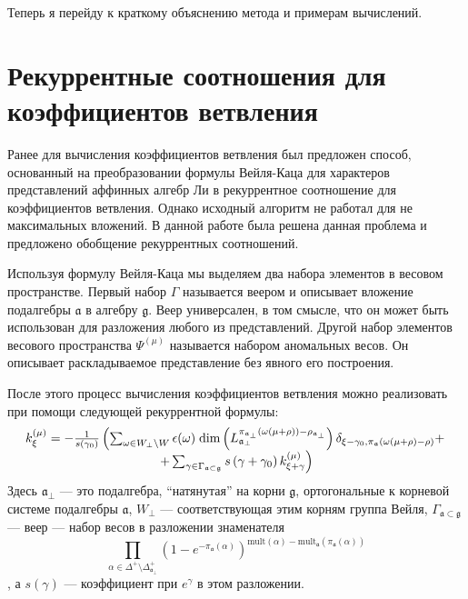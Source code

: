 \documentclass[a4paper,12pt]{article}
\theoremstyle{definition} \newtheorem{Def}{Definition}
\begin{document}
Теперь я перейду к краткому объяснению метода и примерам вычислений.

\section{Рекуррентные соотношения для коэффициентов ветвления}
\label{sec:branching}

Ранее для вычисления коэффициентов ветвления был предложен способ, основанный на преобразовании
формулы Вейля-Каца для характеров представлений аффинных алгебр Ли в рекуррентное соотношение для
коэффициентов ветвления. Однако исходный алгоритм не работал для не максимальных вложений. В данной
работе была решена данная проблема и предложено обобщение рекуррентных соотношений. 

Используя формулу Вейля-Каца мы выделяем два набора элементов в весовом пространстве. Первый набор $\Gamma$
называется веером и описывает вложение подалгебры $\mathfrak{a}$ в алгебру $\mathfrak{g}$. Веер
универсален, в том смысле, что он может быть использован для разложения любого из представлений.
Другой набор элементов весового пространства $\Psi ^{\left( \mu \right) }$ называется набором
аномальных весов. Он описывает раскладываемое представление без явного его построения. 

После этого процесс вычисления коэффициентов ветвления можно реализовать при помощи следующей
рекуррентной формулы:
\begin{equation}
  \label{eq:1}
  \begin{array}{c}
      k_{\xi }^{\left( \mu \right) }=-\frac{1}{s\left( \gamma _{0}\right) }\left(
  \sum_{\omega\in W_{\bot}\backslash W} \epsilon(\omega)\; {\rm dim}\left(L^{\pi_{\mathfrak{a}_{\bot}}(\omega(\mu+\rho))-\rho_{\mathfrak{a}_{\bot}}}_{\mathfrak{a}_{\bot}}\right) \delta_{\xi-\gamma_0,\pi_{\mathfrak{a}}(\omega(\mu+\rho)-\rho)}+ \right.\\
\left.
+\sum_{\gamma \in
\Gamma _{\frak{a}\subset \frak{g}}}s\left( \gamma +\gamma _{0}\right) k_{\xi
+\gamma }^{\left( \mu \right) }\right)

  \end{array}
\end{equation}
Здесь $\mathfrak{a}_{\bot}$ --- это подалгебра, ``натянутая'' на корни $\mathfrak{g}$, ортогональные
к корневой системе подалгебры  $\mathfrak{a}$, $W_{\bot}$ --- соответствующая этим корням группа Вейля,
$\Gamma_{\mathfrak{a}\subset \mathfrak{g}}$ --- веер --- набор весов в разложении знаменателя $$\prod_{\alpha\in \Delta^{+}\setminus \Delta^{+}_{\mathfrak{a}_{\bot}}}
(1-e^{-\pi_{\mathfrak{a}}(\alpha)})^{\mathrm{mult}(\alpha)-\mathrm{mult}_{\mathfrak{a}}(\pi_{\mathfrak{a}}(\alpha))}$$, а $s(\gamma)$ ---
коэффициент при  $e^{\gamma}$ в этом разложении.
\end{document}
